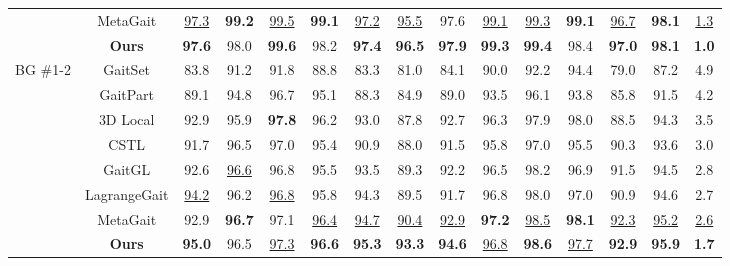 \documentclass[10pt,twocolumn,letterpaper]{article}
\begin{document}
\begin{table}[tbp]
{\begin{tabular}{c|c|ccccccccccc|c|c}
         & MetaGait \cite{dou2022metagait} & \underline{97.3}  & \textbf{99.2}  & \underline{99.5}  & \textbf{99.1}  & \underline{97.2}  & \underline{95.5}  & 97.6  & \underline{99.1}    & \underline{99.3}  & \textbf{99.1}  & \underline{96.7}  & \textbf{98.1} & \underline{1.3} \\
\cline{2-15}          & \textbf{Ours} & \textbf{97.6}  & 98.0  & \textbf{99.6}    & 98.2    & \textbf{97.4}  & \textbf{96.5}  & \textbf{97.9}  & \textbf{99.3}  & \textbf{99.4}  & 98.4  & \textbf{97.0}  & \textbf{98.1} & \textbf{1.0}\\
    \hline
    \multirow{4}[12]{*}{BG \#1-2} & GaitSet \cite{chao2019gaitset} & 83.8  & 91.2  & 91.8  & 88.8  & 83.3  & 81.0    & 84.1  & 90.0    & 92.2  & 94.4  & 79.0    & 87.2 &4.9 \\
           & GaitPart \cite{fan2020gaitpart} & 89.1  & 94.8  & 96.7  & 95.1  & 88.3  & 84.9  & 89.0    & 93.5  & 96.1  & 93.8  & 85.8  & 91.5&4.2 \\
          & 3D Local \cite{huang20213d} & 92.9  & 95.9  & \textbf{97.8}  & 96.2  & 93.0    & 87.8  & 92.7  & 96.3  & 97.9  & 98.0    & 88.5  & 94.3&3.5 \\
           & CSTL \cite{huang2021context}  & 91.7  & 96.5  & 97.0    & 95.4  & 90.9  & 88.0    & 91.5  & 95.8  & 97.0    & 95.5  & 90.3  & 93.6 &3.0\\
           & GaitGL \cite{lin2021gait} & 92.6  & \underline{96.6}  & 96.8  & 95.5  & 93.5  & 89.3  & 92.2  & 96.5  & 98.2  & 96.9  & 91.5  & 94.5&2.8 \\
          & LagrangeGait \cite{chai2022lagrange} & \underline{94.2}  & 96.2  & \underline{96.8}  & 95.8  & 94.3  & 89.5  & 91.7  & 96.8  & 98.0    & 97.0    & 90.9  & 94.6&2.7 \\
          & MetaGait \cite{dou2022metagait} & 92.9  & \textbf{96.7}  & 97.1  & \underline{96.4}  & \underline{94.7}  & \underline{90.4}  & \underline{92.9}  & \textbf{97.2}  & \underline{98.5}    & \textbf{98.1}    & \underline{92.3}  & \underline{95.2} &\underline{2.6}\\
\cline{2-15}          & \textbf{Ours} & \textbf{95.0}  & 96.5  & \underline{97.3}  & \textbf{96.6}  & \textbf{95.3}  & \textbf{93.3}  & \textbf{94.6}  & \underline{96.8}  & \textbf{98.6}  & \underline{97.7}  & \textbf{92.9}    & \textbf{95.9}&\textbf{1.7} \\
    \hline

\end{tabular}}
\end{table}
\end{document}
